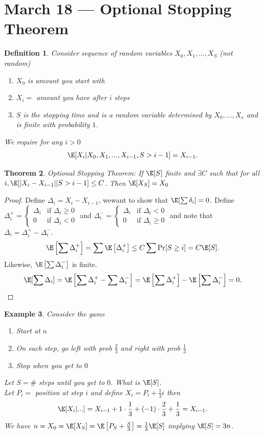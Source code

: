 \documentclass[a4paper]{article}
\newtheorem{thm}{Theorem}[section]
\newtheorem{defn}[thm]{Definition}
\newtheorem{eg}[thm]{Example}
\begin{document}
\section{March 18 --- Optional Stopping Theorem}
\begin{defn}
    Consider sequence of random variables $X_0,X_1,...,X_S$ (not random)
    \begin{enumerate}
        \item $X_0$ is amount you start with
        \item $X_i=$ amount you have after $i$ steps
        \item $S$ is the stopping time and is a random variable determined by $X_0,...,X_s$ and is finite with probability $1$.
    \end{enumerate}
    We require for any $i>0$
    \[
    \E[X_i | X_0,X_1,...,X_{i-1}, S>i-1]=X_{i-1}
    .\] 
\end{defn}
\begin{thm}
    Optional Stopping Theorem: If $\E[S]$ finite and $\exists C$ such that for all $i, \E[|X_i-X_{i-1}| | S>i-1]\leq C$. Then $\E[X_S]=X_0$
\end{thm}
\begin{proof}
    Define $\Delta_i=X_i-X_{i-1}$, wewant to show that $\E[\sum \delta_i]=0$. Define $\Delta_i^+= \begin{cases}
        \Delta_i & \text{if } \Delta_i\geq0 \\
        0 & \text{if } \Delta_i< 0
    \end{cases}$ and $\Delta_i^-= \begin{cases}
        \Delta_i & \text{if } \Delta_i< 0 \\
        0 & \text{if } \Delta_i\geq 0
    \end{cases}$ and note that $\Delta_i=\Delta_i^+-\Delta_i^-$.
    \[
    \E\left [\sum \Delta_i^+\right ]=\sum \E\left [\Delta_i^+\right ] \leq C \sum \Pr[S\geq i] =C \E[S]
    .\] 
    Likewise, $\E\left [ \sum \Delta_i^-\right ]$ is finite. \\
    \[
    \E[\sum \Delta_i]=\E\left [\sum \Delta_i^+-\sum \Delta_i^- \right ]=\E\left [\sum \Delta_i^+ \right ]-\E\left [\sum \Delta_i^- \right ]=0
    .\] 
\end{proof}
\begin{eg}
    Consider the game 
    \begin{enumerate}
        \item Start at $n$
        \item On each step, go left with prob $\frac{2}{3}$ and right with prob $\frac{1}{3}$
        \item Stop when you get to $0$
    \end{enumerate}
    Let $S=\#$ steps until you get to $0$. What is $\E[S]$. \\
    Let $P_i=$ position at step $i$ and define $X_i=P_i+\frac{1}{3}i$ then 
    \[
    \E[X_i | ...]=X_{i-1}+1\cdot \frac{1}{3}+(-1)\cdot \frac{2}{3}+\frac{1}{3}=X_{i-1}
    .\] 
    We have $n=X_0=\E[X_S]=\E\left [P_S+\frac{S}{3}\right ]=\frac{1}{3}\E[S]$ implying $\E[S]=3n$.  
\end{eg}
\newpage
\end{document}
